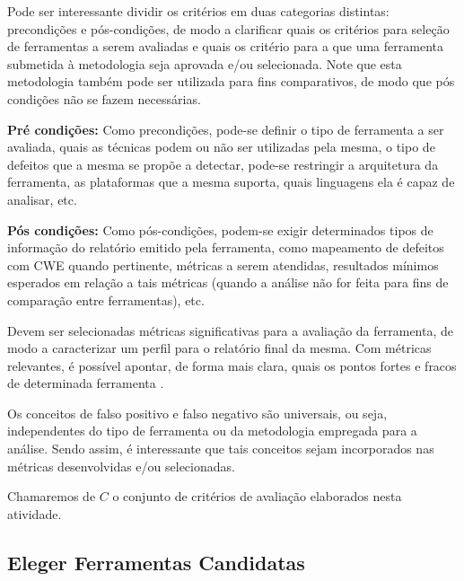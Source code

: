 Pode ser interessante dividir os critérios em duas categorias distintas: precondições e pós-condições, de modo a clarificar quais os critérios para seleção de ferramentas a serem avaliadas e quais os critério para a que uma ferramenta submetida à metodologia seja aprovada e/ou selecionada. Note que esta metodologia também pode ser utilizada para fins comparativos, de modo que pós condições não se fazem necessárias.

\textbf{Pré condições:} Como precondições, pode-se definir o tipo de ferramenta a ser avaliada, quais as técnicas podem ou não ser utilizadas pela mesma, o tipo de defeitos que a mesma se propõe a detectar, pode-se restringir a arquitetura da ferramenta, as plataformas que a mesma suporta, quais linguagens ela é capaz de analisar, etc.

\textbf{Pós condições:} Como pós-condições, podem-se exigir determinados tipos de informação do relatório emitido pela ferramenta, como mapeamento de defeitos com CWE quando pertinente, métricas a serem atendidas, resultados mínimos esperados em relação a tais métricas (quando a análise não for feita para fins de comparação entre ferramentas), etc.

Devem ser selecionadas métricas significativas para a avaliação da ferramenta, de modo a caracterizar um perfil para o relatório final da mesma. Com métricas relevantes, é possível apontar, de forma mais clara, quais os pontos fortes e fracos de determinada ferramenta \cite{nsa}.

Os conceitos de falso positivo e falso negativo são universais, ou seja, independentes do tipo de ferramenta ou da metodologia empregada para a análise. Sendo assim, é interessante que tais conceitos sejam incorporados nas métricas desenvolvidas e/ou selecionadas.

Chamaremos de $C$ o conjunto de critérios de avaliação elaborados nesta atividade.

\subsection{Eleger Ferramentas Candidatas}

